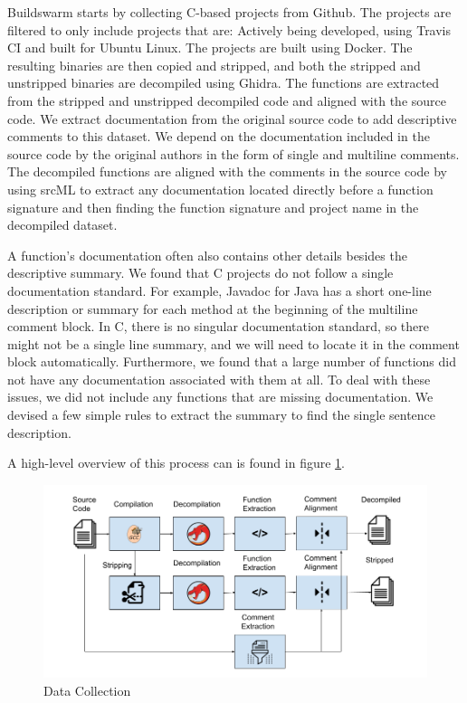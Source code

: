 Buildswarm starts by collecting C-based projects from Github. The projects are filtered to only include projects that are: Actively being developed, using Travis CI and built for Ubuntu Linux. The projects are built using Docker. The resulting binaries are then copied and stripped, and both the stripped and unstripped binaries are decompiled using Ghidra. The functions are extracted from the stripped and unstripped decompiled code and aligned with the source code. 
We extract documentation from the original source code to add descriptive comments to this dataset. We depend on the documentation included in the source code by the original authors in the form of single and multiline comments. The decompiled functions are aligned with the comments in the source code by using srcML to extract any documentation located directly before a function signature and then finding the function signature and project name in the decompiled dataset.

A function's documentation often also contains other details besides the descriptive summary. We found that C projects do not follow a single documentation standard. For example, Javadoc for Java has a short one-line description or summary for each method at the beginning of the multiline comment block. In C, there is no singular documentation standard, so there might not be a single line summary, and we will need to locate it in the comment block automatically. 
Furthermore, we found that a large number of functions did not have any documentation associated with them at all. To deal with these issues, we did not include any functions that are missing documentation. We devised a few simple rules to extract the summary to find the single sentence description.

A high-level overview of this process can is found in figure \ref{fig:dataCollection}.

\begin{figure}[!h]
  \centering
  \includegraphics[width=\linewidth]{img/dataCollection.png}
  \caption{Data Collection}
  \label{fig:dataCollection}
\end{figure}

